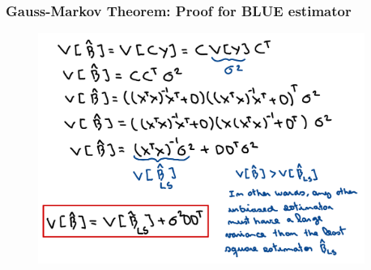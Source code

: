 \begin{frame}
    \frametitle{Gauss-Markov Theorem: Proof for BLUE estimator}
    \begin{figure}
        \centering
        \includegraphics[width=0.95\textwidth]{sections/least_squares_estimation/figures/gm_proof_variance.pdf}
    \end{figure}
\end{frame}

